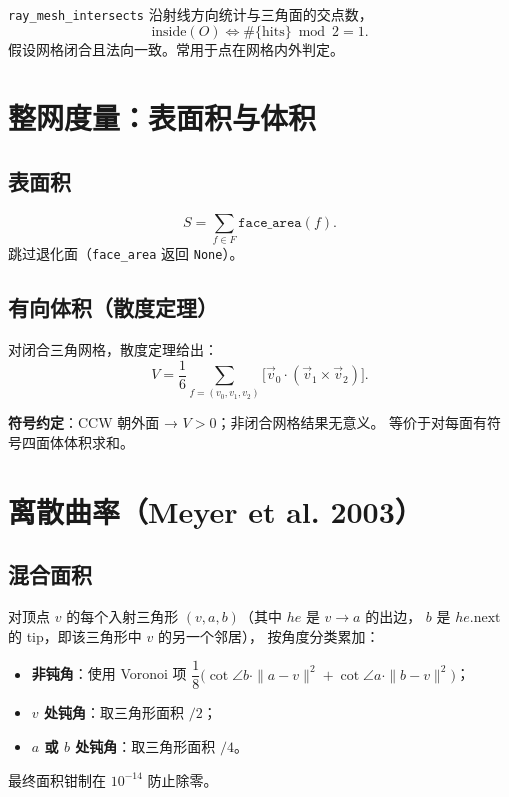 \documentclass[11pt,a4paper]{article}
\begin{document}
\texttt{ray\_mesh\_intersects} 沿射线方向统计与三角面的交点数，
\[
  \text{inside}(O) \Leftrightarrow \#\{\text{hits}\} \bmod 2 = 1.
\]
假设网格闭合且法向一致。常用于点在网格内外判定。

\section{整网度量：表面积与体积}

\subsection{表面积}

\[
  S = \sum_{f \in F} \texttt{face\_area}(f).
\]
跳过退化面（\texttt{face\_area} 返回 \texttt{None}）。

\subsection{有向体积（散度定理）}

对闭合三角网格，散度定理给出：
\[
  V = \frac{1}{6} \sum_{f=(v_0, v_1, v_2)} \bigl[
    \vec{v}_0 \cdot (\vec{v}_1 \times \vec{v}_2)
  \bigr].
\]

\textbf{符号约定}：CCW 朝外面 → $V > 0$；非闭合网格结果无意义。
等价于对每面有符号四面体体积求和。

\section{离散曲率（Meyer et al. 2003）}

\subsection{混合面积}

对顶点 $v$ 的每个入射三角形 $(v, a, b)$（其中 $he$ 是 $v \to a$ 的出边，
$b$ 是 $he.\mathrm{next}$ 的 tip，即该三角形中 $v$ 的另一个邻居），
按角度分类累加：

\begin{itemize}
  \item \textbf{非钝角}：使用 Voronoi 项
        $\dfrac{1}{8}\bigl(\cot\angle b \cdot \|a-v\|^2 + \cot\angle a \cdot \|b-v\|^2\bigr)$；
  \item \textbf{$v$ 处钝角}：取三角形面积 $/ 2$；
  \item \textbf{$a$ 或 $b$ 处钝角}：取三角形面积 $/ 4$。
\end{itemize}

最终面积钳制在 $10^{-14}$ 防止除零。
\end{document}
